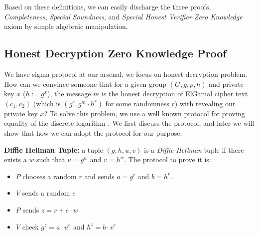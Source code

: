 \begin{displayquote}

$\text{initial r := } g^r}$  

$\text{challenge := } e$

$\text{response h w r e := } r + e \cdot w$

$\text{verify h a e z  := } g^z = a \cdot h^e$

$\text{simulator s e z := } (g^z \cdot h^{-e}, e, z)$

$\text{extractor }  $c_{1}$ $z_{1}$ $c_{2}$ $z_{2}$ := (z_{1} - z_{2}) \cdot (c_{2} - c_{1})^{-1}$

\end{displayquote}

Based on these definitions, we can easily discharge the three proofs, \textit{Completeness}, 
\textit{Special Soundness}, and \textit{Special Honest Verifier Zero Knowledge} axiom by simple 
algebraic manipulation.

\subsection{Honest Decryption Zero Knowledge Proof}
\label{sec:dec_sigma}
We have sigma protocol at our arsenal, we focus on honest decryption 
problem. How can we convince someone that for a given group 
$(G, g, p, h)$ and private key $x$ ($h := g^x$), the message $m$ is the 
honest decryption of ElGamal cipher text $(c_{1}, c_{2})$ (which is $(g^r, g^m \cdot h^r)$ for some randomness $r$) 
with revealing 
our private key $x$? To solve this problem, we use a well known protocol
for proving equality of the discrete logarithm \citep{10.1007/3-540-69053-0_9}.
We first discuss the protocol, and later we will show that how we can adopt 
the protocol for our purpose. 

\textbf{Diffie Hellman Tuple:} a tuple $(g, h, u, v)$ is 
 a \textit{Diffie Hellman} tuple if there exists a $w$ such that 
 $u = g^w$ and $v = h^w$.  The protocol to prove it is:
 
 \begin{itemize}
 \item $P$ chooses a random $r$ and sends $a=g^r$ and $b = h^r$.
 \item $V$ sends a random $e$
 \item $P$ sends $z =r+ e \cdot w$
 \item $V$ check $g^z = a \cdot u^e$ and $h^z = b\cdot v^e$ 
 \end{itemize}
 

